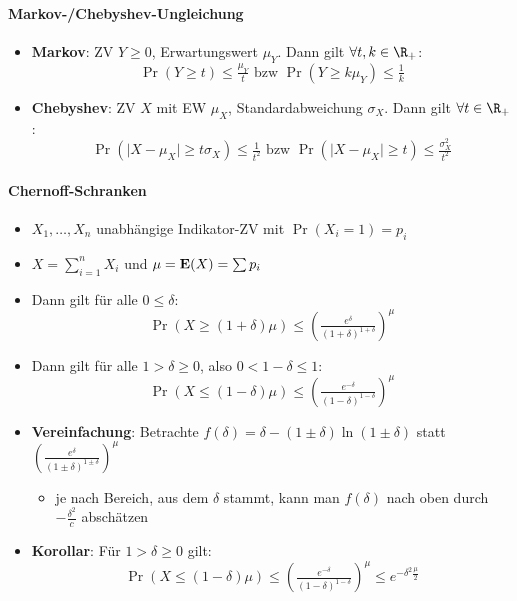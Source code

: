 \paragraph{Markov-/Chebyshev-Ungleichung}
\begin{itemize}
  \item \textbf{Markov}: ZV $ Y \geq 0 $, Erwartungswert $ \mu_Y $. Dann gilt $ \forall t,k \in \R_+ $:
  \begin{equation*}
    \Pr(Y \geq t) \leq \tfrac{\mu_Y}{t} \text{ bzw } \Pr(Y \geq k\mu_Y) \leq \tfrac{1}{k}
  \end{equation*}
  \item \textbf{Chebyshev}: ZV $ X $ mit EW $ \mu_X $, Standardabweichung $ \sigma_X $. Dann gilt $ \forall t \in \R_+ $:
  \begin{equation*}
    \Pr(\vert X - \mu_X \vert \geq t\sigma_X) \leq \tfrac{1}{t^2} \text{ bzw } \Pr(\vert X - \mu_X \vert \geq t) \leq \tfrac{\sigma^2_X}{t^2}
  \end{equation*}
\end{itemize}

\paragraph{Chernoff-Schranken}
\begin{itemize}
  \item $ X_1, \dots, X_n $ unabhängige Indikator-ZV mit $ \Pr(X_i = 1) = p_i $
  \item $ X = \sum_{i=1}^nX_i $ und $ \mu = \text{\textbf{E}}(X) = \sum p_i $
  \item Dann gilt für alle $ 0 \leq \delta $:
  \begin{equation*}
    \Pr(X \geq (1+\delta)\mu) \leq \left( \tfrac{e^\delta}{(1+\delta)^{1+\delta}} \right)^\mu
  \end{equation*}
  \item Dann gilt für alle $ 1 > \delta \geq 0 $, also $ 0 < 1-\delta \leq 1 $:
  \begin{equation*}
    \Pr(X \leq (1-\delta)\mu) \leq \left( \tfrac{e^{-\delta}}{(1-\delta)^{1-\delta}} \right)^\mu
  \end{equation*}
  \item \textbf{Vereinfachung}: Betrachte $ f(\delta) = \delta - (1 \pm \delta)\ln(1\pm\delta) $ statt $ \left( \frac{e^\delta}{(1\pm\delta)^{1\pm\delta}} \right)^\mu $
  \begin{itemize}
    \item je nach Bereich, aus dem $ \delta $ stammt, kann man $ f(\delta) $ nach oben durch $ -\frac{\delta^2}{c} $ abschätzen
  \end{itemize}
  \item \textbf{Korollar}: Für $ 1 > \delta \geq 0 $ gilt:
  \begin{equation*}
    \Pr(X \leq (1-\delta)\mu) \leq \left( \tfrac{e^{-\delta}}{(1-\delta)^{1-\delta}} \right)^\mu \leq e^{-\delta^2\tfrac{\mu}{2}}
  \end{equation*}
\end{itemize}

